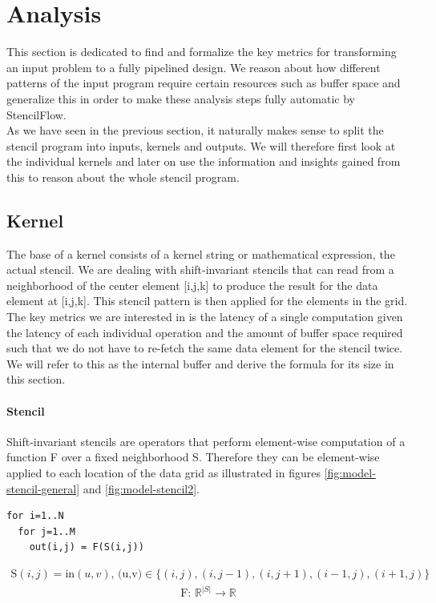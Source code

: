 \section{Analysis}
This section is dedicated to find and formalize the key metrics for transforming an input problem to a fully pipelined design. We reason about how different patterns of the input program require certain resources such as buffer space and generalize this in order to make these analysis steps fully automatic by StencilFlow.\\
As we have seen in the previous section, it naturally makes sense to split the stencil program into inputs, kernels and outputs. We will therefore first look at the individual kernels and later on use the information and insights gained from this to reason about the whole stencil program.


\subsection{Kernel}
The base of a kernel consists of a kernel string or mathematical expression, the actual stencil. We are dealing with shift-invariant stencils that can read from a neighborhood of the center element [i,j,k] to produce the result for the data element at [i,j,k]. This stencil pattern is then applied for the elements in the grid.\\
The key metrics we are interested in is the latency of a single computation given the latency of each individual operation and the amount of buffer space required such that we do not have to re-fetch the same data element for the stencil twice. We will refer to this as the internal buffer and derive the formula for its size in this section. \\


\paragraph{Stencil}
Shift-invariant stencils are operators that perform element-wise computation of a function F over a fixed neighborhood S. Therefore they can be element-wise applied to each location of the data grid as illustrated in figures \ref{fig:model-stencil-general} and \ref{fig:model-stencil2}. 

\begin{verbatim}
for i=1..N
  for j=1..M
    out(i,j) = F(S(i,j))
\end{verbatim}
\begin{align}
\text{S}(i,j) = \text{in}(u,v)
\text{, (u,v)} \in \{(i,j), (i,j-1), (i,j+1), (i-1,j), (i+1,j)\}
\end{align}
\begin{align}
\text{F: } \mathbb{R}^{|S|} \rightarrow \mathbb{R}
\end{align}



